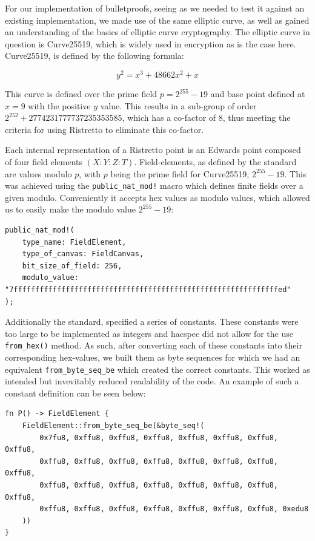 \documentclass{article}
\begin{document}
For our implementation of bulletproofs, seeing as we needed to test it
against an existing implementation, we made use of the same elliptic
curve, as well as gained an understanding of the basics of elliptic
curve cryptography. The elliptic curve in question is Curve25519,
which is widely used in encryption as is the case here. Curve25519,
is defined by the following formula:

$$y^2 = x^3 + 48662x^2 + x$$

This curve is defined over the prime field $p = 2^{255} - 19$ and base
point defined at $x = 9$ with the positive $y$ value. This results
in a sub-group of order $2^{252} + 2774231777737235353585$, which has
a co-factor of $8$, thus meeting the criteria for using Ristretto to
eliminate this co-factor.

Each internal representation of a Ristretto point is an Edwards point
composed of four field elements $(X : Y : Z : T)$. Field-elements,
as defined by the standard are values modulo $p$, with $p$ being the
prime field for Curve25519, $2^{255} - 19$. This was achieved using
the \texttt{public\_nat\_mod!} macro which defines finite fields over
a given modulo. Conveniently it accepts hex values as modulo values,
which allowed us to easily make the modulo value $2^{255} - 19$:

\begin{lstlisting}
public_nat_mod!(
	type_name: FieldElement,
	type_of_canvas: FieldCanvas,
	bit_size_of_field: 256,
	modulo_value: "7fffffffffffffffffffffffffffffffffffffffffffffffffffffffffffffed"
);
\end{lstlisting}

Additionally the standard, specified a series of constants. These
constants were too large to be implemented as integers and hacspec
did not allow for the use \texttt{from\_hex()} method. As such, after
converting each of these constants into their corresponding hex-values,
we built them as byte sequences for which we had an equivalent
\texttt{from\_byte\_seq\_be} which created the correct constants. This
worked as intended but invevitably reduced readability of the code. An
example of such a constant definition can be seen below:

\begin{lstlisting}
fn P() -> FieldElement {
	FieldElement::from_byte_seq_be(&byte_seq!(
		0x7fu8, 0xffu8, 0xffu8, 0xffu8, 0xffu8, 0xffu8, 0xffu8, 0xffu8,
		0xffu8, 0xffu8, 0xffu8, 0xffu8, 0xffu8, 0xffu8, 0xffu8, 0xffu8,
		0xffu8, 0xffu8, 0xffu8, 0xffu8, 0xffu8, 0xffu8, 0xffu8, 0xffu8,
		0xffu8, 0xffu8, 0xffu8, 0xffu8, 0xffu8, 0xffu8, 0xffu8, 0xedu8
	))
}
\end{lstlisting}
\end{document}
